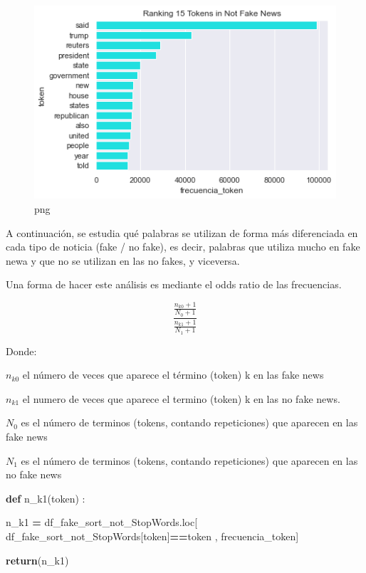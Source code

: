 \documentclass[
  11pt,
  a4paper,
]{article}
\newenvironment{Shaded}{\begin{snugshade}}{\end{snugshade}}
\newcommand{\ControlFlowTok}[1]{\textcolor[rgb]{0.13,0.29,0.53}{\textbf{#1}}}
\newcommand{\KeywordTok}[1]{\textcolor[rgb]{0.13,0.29,0.53}{\textbf{#1}}}
\newcommand{\NormalTok}[1]{#1}
\newcommand{\OperatorTok}[1]{\textcolor[rgb]{0.81,0.36,0.00}{\textbf{#1}}}
\newcommand{\StringTok}[1]{\textcolor[rgb]{0.31,0.60,0.02}{#1}}
\begin{document}
\begin{figure}
\centering
\includegraphics{output_64_0.png}
\caption{png}
\end{figure}

A continuación, se estudia qué palabras se utilizan de forma más
diferenciada en cada tipo de noticia (fake / no fake), es decir,
palabras que utiliza mucho en fake newa y que no se utilizan en las no
fakes, y viceversa.

Una forma de hacer este análisis es mediante el odds ratio de las
frecuencias.

\[\dfrac{ \frac{n_{k0} + 1}{N_0 + 1} }{  \frac{n_{k1} + 1}{N_1 +1}  }\]

Donde:

\(n_{k0}\) el número de veces que aparece el término (token) k en las
fake news

\(n_{k1}\) el numero de veces que aparece el termino (token) k en las no
fake news.

\(N_0\) es el número de terminos (tokens, contando repeticiones) que
aparecen en las fake news

\(N_1\) es el número de terminos (tokens, contando repeticiones) que
aparecen en las no fake news

\begin{Shaded}
\begin{Highlighting}[]
\KeywordTok{def}\NormalTok{ n\_k1(token) : }

\NormalTok{    n\_k1 }\OperatorTok{=}\NormalTok{ df\_fake\_sort\_not\_StopWords.loc[ df\_fake\_sort\_not\_StopWords[}\StringTok{\textquotesingle{}token\textquotesingle{}}\NormalTok{]}\OperatorTok{==}\NormalTok{token , }\StringTok{\textquotesingle{}frecuencia\_token\textquotesingle{}}\NormalTok{]}

    \ControlFlowTok{return}\NormalTok{(n\_k1)}
\end{Highlighting}
\end{Shaded}
\end{document}
